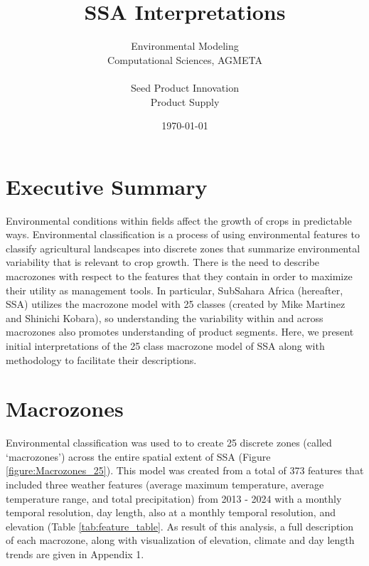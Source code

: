 \documentclass[titlepage, 11 pt]{article}
\numberwithin{figure}{section}
\begin{document}
\title{SSA Interpretations}
\author{Environmental Modeling \\ Computational Sciences, AGMETA \\   
	\\ Seed Product Innovation \\ Product Supply  } 

\date{\today}

\maketitle


\hypertarget{toc}{} %
\tableofcontents
\setcounter{tocdepth}{4}






\newpage



	
	
	\section{Executive Summary}
	
	Environmental conditions within fields affect the growth of crops in predictable ways. Environmental classification is a process of using environmental features to classify agricultural landscapes into discrete zones that summarize environmental variability that is relevant to crop growth. There is the need to describe macrozones with respect to the features that they contain in order to maximize their utility as management tools.  In particular, SubSahara Africa (hereafter, SSA) utilizes the macrozone model with 25 classes (created by Mike Martinez and Shinichi Kobara), so understanding the variability within and across macrozones also promotes understanding of product segments.  Here, we present initial interpretations of the 25 class macrozone model of SSA along with methodology to facilitate their descriptions.  
	
	

	
	\section{Macrozones}
	Environmental classification was used to to create 25 discrete zones (called `macrozones') across the entire spatial extent of SSA (Figure \ref{figure:Macrozones_25}).  This model was created from a total of 373 features that included three weather features (average maximum temperature, average temperature range, and total precipitation) from 2013 - 2024 with a monthly temporal resolution, day length, also at a monthly temporal resolution, and elevation (Table \ref{tab:feature_table}. As result of this analysis, a full description of each macrozone, along with visualization of elevation, climate and day length trends are given in Appendix 1. 
	
\end{document}
